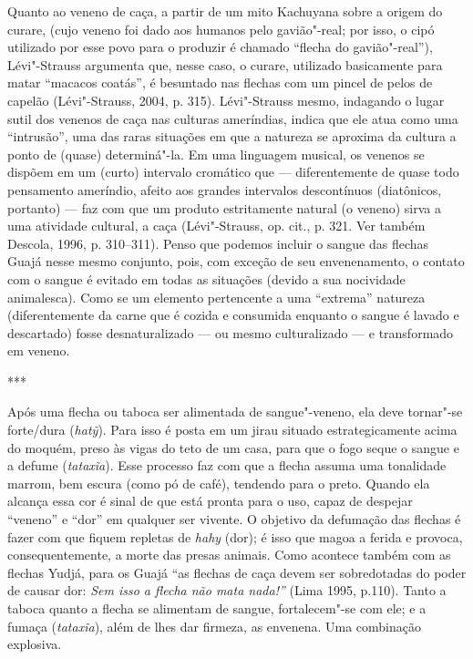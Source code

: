 Quanto ao veneno de caça, a partir de um mito Kachuyana sobre a origem
do curare, (cujo veneno foi dado aos humanos pelo gavião"-real; por isso,
o cipó utilizado por esse povo para o produzir é chamado ``flecha do
gavião"-real''), Lévi"-Strauss argumenta que, nesse caso, o curare,
utilizado basicamente para matar ``macacos coatás'', é besuntado nas
flechas com um pincel de pelos de capelão (Lévi"-Strauss, 2004, p. 315).
Lévi"-Strauss mesmo, indagando o lugar sutil dos venenos de caça nas
culturas ameríndias, indica que ele atua como uma ``intrusão'', uma das
raras situações em que a natureza se aproxima da cultura a ponto de
(quase) determiná"-la. Em uma linguagem musical, os venenos se dispõem em
um (curto) intervalo cromático que --- diferentemente de quase todo
pensamento ameríndio, afeito aos grandes intervalos descontínuos
(diatônicos, portanto) --- faz com que um produto estritamente natural (o
veneno) sirva a uma atividade cultural, a caça (Lévi"-Strauss, op. cit.,
p. 321. Ver também Descola, 1996, p. 310--311). Penso que podemos incluir
o sangue das flechas Guajá nesse mesmo conjunto, pois, com exceção de
seu envenenamento, o contato com o sangue é evitado em todas as
situações (devido a sua nocividade animalesca). Como se um elemento
pertencente a uma ``extrema'' natureza (diferentemente da carne que é
cozida e consumida enquanto o sangue é lavado e descartado) fosse
desnaturalizado --- ou mesmo culturalizado --- e transformado em veneno.

\begin{center}
***
\end{center}

Após uma flecha ou taboca ser alimentada de sangue"-veneno, ela deve
tornar"-se forte/dura (\emph{hatỹ}). Para isso é posta em um jirau
situado estrategicamente acima do moquém, preso às vigas do teto de um
casa, para que o fogo seque o sangue e a defume (\emph{tataxĩa}). Esse
processo faz com que a flecha assuma uma tonalidade marrom, bem escura
(como pó de café), tendendo para o preto. Quando ela alcança essa cor é
sinal de que está pronta para o uso, capaz de despejar ``veneno'' e ``dor''
em qualquer ser vivente. O objetivo da defumação das flechas é fazer com
que fiquem repletas de \emph{hahy} (dor); é isso que magoa a ferida e
provoca, consequentemente, a morte das presas animais. Como acontece
também com as flechas Yudjá, para os Guajá ``as flechas de caça devem
ser sobredotadas do poder de causar dor: \emph{Sem isso a flecha não
mata nada!''} (Lima 1995, p.110). Tanto a taboca quanto a flecha se
alimentam de sangue, fortalecem"-se com ele; e a fumaça (\emph{tataxĩa}),
além de lhes dar firmeza, as envenena. Uma combinação explosiva.

